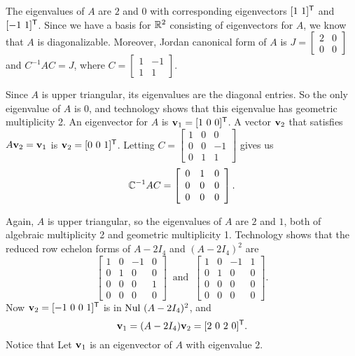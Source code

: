 \ba
\item The eigenvalues of $A$ are $2$ and $0$ with corresponding eigenvectors $[1 \ 1]^{\tr}$ and $[-1 \ 1]^{\mathsf{T}}$. Since we have a basis for $\mathbb{R}^2$ consisting of eigenvectors for $A$, we know that $A$ is diagonalizable. Moreover, Jordan canonical form of $A$ is $J = \left[ \begin{array}{cc} 2&0\\0&0 \end{array} \right]$ and $C^{-1}AC = J$, where $C = \left[ \begin{array}{cr} 1&-1\\1&1 \end{array} \right]$. 

\item Since $A$ is upper triangular, its eigenvalues are the diagonal entries. So the only eigenvalue of $A$ is 0, and technology shows that this eigenvalue has geometric multiplicity 2. An eigenvector for $A$ is $\mathbf{v}_1 = [1 \ 0 \ 0]^{\mathsf{T}}$. A vector $\mathbf{v}_2$ that satisfies $A \mathbf{v}_2 = \mathbf{v}_1$ is $\mathbf{v}_2 = [0 \ 0 \ 1]^{\mathsf{T}}$. Letting $C = \left[ \begin{array}{ccr} 1&0&0\\0&0&-1\\0&1&1 \end{array} \right]$ gives us 
\[\mathbb{C}^{-1}AC = \left[ \begin{array}{ccc} 0&1&0 \\ 0&0&0 \\ 0&0&0 \end{array} \right].\]

\item Again, $A$ is upper triangular, so the eigenvalues of $A$ are $2$ and $1$, both of algebraic multiplicity 2 and geometric multiplicity 1. Technology shows that the reduced row echelon forms of $A - 2I_4$ and $(A-2I_4)^2$ are 
\[\left[ \begin{array}{ccrc} 1&0&-1&0 \\ 0&1&0&0 \\ 0&0&0&1 \\ 0&0&0&0 \end{array} \right] \ \text{ and } \ \left[ \begin{array}{ccrc} 1&0&-1&1 \\ 0&1&0&0 \\ 0&0&0&0 \\ 0&0&0&0 \end{array} \right].\]
Now $\mathbf{v}_2 = [-1 \ 0 \ 0 \ 1]^{\mathsf{T}}$ is in $\text{Nul } (A-2I_4)^2$, and 
\[\vv_1 = (A-2I_4)\vv_2 = [2 \ 0 \ 2 \ 0]^{\tr}.\]
Notice that  Let $\mathbf{v}_1$ is an eigenvector of $A$ with eigenvalue $2$. 

